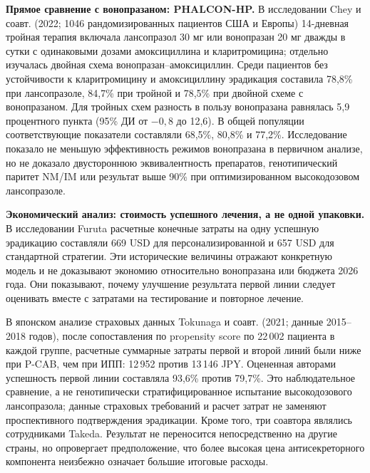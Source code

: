 \documentclass[11pt,a4paper,notitlepage]{report}
\newcommand{\src}[1]{\unskip\space\cite{#1}}
\begin{document}
\textbf{Прямое сравнение с вонопразаном: PHALCON-HP.} В исследовании Chey и соавт. (2022; 1046 рандомизированных пациентов США и Европы) 14-дневная тройная терапия включала лансопразол 30 мг или вонопразан 20 мг дважды в сутки с одинаковыми дозами амоксициллина и кларитромицина; отдельно изучалась двойная схема вонопразан--амоксициллин. Среди пациентов без устойчивости к кларитромицину и амоксициллину эрадикация составила 78,8\% при лансопразоле, 84,7\% при тройной и 78,5\% при двойной схеме с вонопразаном. Для тройных схем разность в пользу вонопразана равнялась 5,9 процентного пункта (95\% ДИ от $-0{,}8$ до 12,6). В общей популяции соответствующие показатели составляли 68,5\%, 80,8\% и 77,2\%. Исследование показало не меньшую эффективность режимов вонопразана в первичном анализе, но не доказало двустороннюю эквивалентность препаратов, генотипический паритет NM/IM или результат выше 90\% при оптимизированном высокодозовом лансопразоле.\src{hpphalcon2022}

\textbf{Экономический анализ: стоимость успешного лечения, а не одной упаковки.} В исследовании Furuta расчетные конечные затраты на одну успешную эрадикацию составляли 669 USD для персонализированной и 657 USD для стандартной стратегии. Эти исторические величины отражают конкретную модель и не доказывают экономию относительно вонопразана или бюджета 2026 года. Они показывают, почему улучшение результата первой линии следует оценивать вместе с затратами на тестирование и повторное лечение.\src{hptailored2007}

В японском анализе страховых данных Tokunaga и соавт. (2021; данные 2015--2018 годов), после сопоставления по propensity score по 22\,002 пациента в каждой группе, расчетные суммарные затраты первой и второй линий были ниже при P-CAB, чем при ИПП: 12\,952 против 13\,146 JPY. Оцененная авторами успешность первой линии составляла 93,6\% против 79,7\%. Это наблюдательное сравнение, а не генотипически стратифицированное испытание высокодозового лансопразола; данные страховых требований и расчет затрат не заменяют проспективного подтверждения эрадикации. Кроме того, три соавтора являлись сотрудниками Takeda. Результат не переносится непосредственно на другие страны, но опровергает предположение, что более высокая цена антисекреторного компонента неизбежно означает большие итоговые расходы.\src{hpcost2021}
\end{document}
